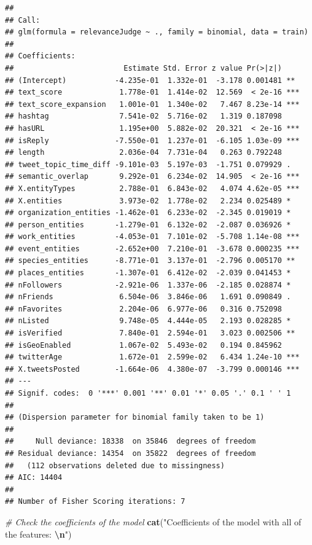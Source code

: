 \documentclass[
]{article}
\newenvironment{Shaded}{\begin{snugshade}}{\end{snugshade}}
\newcommand{\CommentTok}[1]{\textcolor[rgb]{0.56,0.35,0.01}{\textit{#1}}}
\newcommand{\FunctionTok}[1]{\textcolor[rgb]{0.13,0.29,0.53}{\textbf{#1}}}
\newcommand{\NormalTok}[1]{#1}
\newcommand{\SpecialCharTok}[1]{\textcolor[rgb]{0.81,0.36,0.00}{\textbf{#1}}}
\newcommand{\StringTok}[1]{\textcolor[rgb]{0.31,0.60,0.02}{#1}}
\begin{document}
\begin{verbatim}
## 
## Call:
## glm(formula = relevanceJudge ~ ., family = binomial, data = train)
## 
## Coefficients:
##                         Estimate Std. Error z value Pr(>|z|)    
## (Intercept)           -4.235e-01  1.332e-01  -3.178 0.001481 ** 
## text_score             1.778e-01  1.414e-02  12.569  < 2e-16 ***
## text_score_expansion   1.001e-01  1.340e-02   7.467 8.23e-14 ***
## hashtag                7.541e-02  5.716e-02   1.319 0.187098    
## hasURL                 1.195e+00  5.882e-02  20.321  < 2e-16 ***
## isReply               -7.550e-01  1.237e-01  -6.105 1.03e-09 ***
## length                 2.036e-04  7.731e-04   0.263 0.792248    
## tweet_topic_time_diff -9.101e-03  5.197e-03  -1.751 0.079929 .  
## semantic_overlap       9.292e-01  6.234e-02  14.905  < 2e-16 ***
## X.entityTypes          2.788e-01  6.843e-02   4.074 4.62e-05 ***
## X.entities             3.973e-02  1.778e-02   2.234 0.025489 *  
## organization_entities -1.462e-01  6.233e-02  -2.345 0.019019 *  
## person_entities       -1.279e-01  6.132e-02  -2.087 0.036926 *  
## work_entities         -4.053e-01  7.101e-02  -5.708 1.14e-08 ***
## event_entities        -2.652e+00  7.210e-01  -3.678 0.000235 ***
## species_entities      -8.771e-01  3.137e-01  -2.796 0.005170 ** 
## places_entities       -1.307e-01  6.412e-02  -2.039 0.041453 *  
## nFollowers            -2.921e-06  1.337e-06  -2.185 0.028874 *  
## nFriends               6.504e-06  3.846e-06   1.691 0.090849 .  
## nFavorites             2.204e-06  6.977e-06   0.316 0.752098    
## nListed                9.748e-05  4.444e-05   2.193 0.028285 *  
## isVerified             7.840e-01  2.594e-01   3.023 0.002506 ** 
## isGeoEnabled           1.067e-02  5.493e-02   0.194 0.845962    
## twitterAge             1.672e-01  2.599e-02   6.434 1.24e-10 ***
## X.tweetsPosted        -1.664e-06  4.380e-07  -3.799 0.000146 ***
## ---
## Signif. codes:  0 '***' 0.001 '**' 0.01 '*' 0.05 '.' 0.1 ' ' 1
## 
## (Dispersion parameter for binomial family taken to be 1)
## 
##     Null deviance: 18338  on 35846  degrees of freedom
## Residual deviance: 14354  on 35822  degrees of freedom
##   (112 observations deleted due to missingness)
## AIC: 14404
## 
## Number of Fisher Scoring iterations: 7
\end{verbatim}

\begin{Shaded}
\begin{Highlighting}[]
\CommentTok{\# Check the coefficients of the model}
\FunctionTok{cat}\NormalTok{(}\StringTok{"Coefficients of the model with all of the features: }\SpecialCharTok{\textbackslash{}n}\StringTok{"}\NormalTok{)}
\end{Highlighting}
\end{Shaded}
\end{document}
